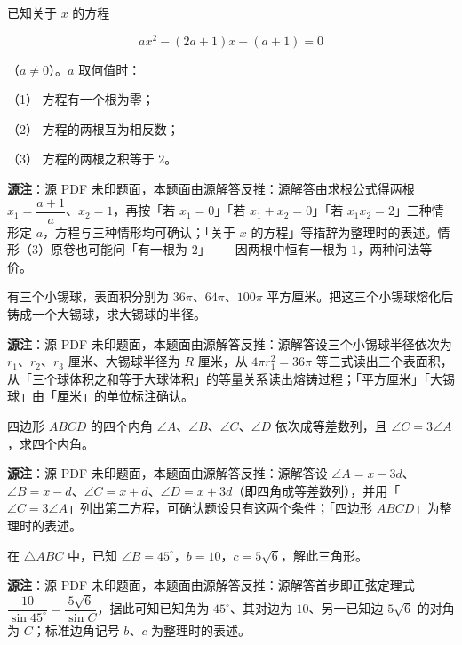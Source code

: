 \begin{question}
已知关于 $x$ 的方程

\nopagebreak[4]
\[
ax^2-(2a+1)x+(a+1)=0
\]

（$a\ne0$）。$a$ 取何值时：

（1） 方程有一个根为零；

（2） 方程的两根互为相反数；

（3） 方程的两根之积等于 $2$。

\begin{gktip}
\textbf{源注}：源 PDF 未印题面，本题面由源解答反推：源解答由求根公式得两根 $x_1=\dfrac{a+1}{a}$、$x_2=1$，再按「若 $x_1=0$」「若 $x_1+x_2=0$」「若 $x_1x_2=2$」三种情形定 $a$，方程与三种情形均可确认；「关于 $x$ 的方程」等措辞为整理时的表述。情形（3）原卷也可能问「有一根为 $2$」——因两根中恒有一根为 $1$，两种问法等价。
\end{gktip}

\end{question}
\begin{question}
有三个小锡球，表面积分别为 $36\pi$、$64\pi$、$100\pi$ 平方厘米。把这三个小锡球熔化后铸成一个大锡球，求大锡球的半径。

\begin{gktip}
\textbf{源注}：源 PDF 未印题面，本题面由源解答反推：源解答设三个小锡球半径依次为 $r_1$、$r_2$、$r_3$ 厘米、大锡球半径为 $R$ 厘米，从 $4\pi r_1^2=36\pi$ 等三式读出三个表面积，从「三个球体积之和等于大球体积」的等量关系读出熔铸过程；「平方厘米」「大锡球」由「厘米」的单位标注确认。
\end{gktip}

\end{question}
\begin{question}
四边形 $ABCD$ 的四个内角 $\angle A$、$\angle B$、$\angle C$、$\angle D$ 依次成等差数列，且 $\angle C=3\angle A$，求四个内角。

\begin{gktip}
\textbf{源注}：源 PDF 未印题面，本题面由源解答反推：源解答设 $\angle A=x-3d$、$\angle B=x-d$、$\angle C=x+d$、$\angle D=x+3d$（即四角成等差数列），并用「$\angle C=3\angle A$」列出第二方程，可确认题设只有这两个条件；「四边形 $ABCD$」为整理时的表述。
\end{gktip}

\end{question}
\begin{question}
在 $\triangle ABC$ 中，已知 $\angle B=45^\circ$，$b=10$，$c=5\sqrt6$，解此三角形。

\begin{gktip}
\textbf{源注}：源 PDF 未印题面，本题面由源解答反推：源解答首步即正弦定理式 $\dfrac{10}{\sin45^\circ}=\dfrac{5\sqrt6}{\sin C}$，据此可知已知角为 $45^\circ$、其对边为 $10$、另一已知边 $5\sqrt6$ 的对角为 $C$；标准边角记号 $b$、$c$ 为整理时的表述。
\end{gktip}

\end{question}
